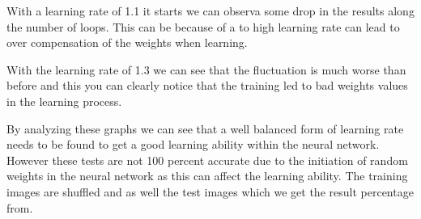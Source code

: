 \documentclass[a4paper, 12pt]{article}
\begin{document}

With a learning rate of 1.1 it starts we can observa some drop in the results along the number of loops. This can be because of a to high learning rate can lead to over compensation of the weights when learning.


With the learning rate of 1.3 we can see that the fluctuation is much worse than before and this you can clearly notice that the training led to bad weights values in the learning process.




By analyzing these graphs we can see that a well balanced form of learning rate needs to be found to get a good learning ability within the neural network. However these tests are not 100 percent accurate due to the initiation of random weights in the neural network as this can affect the learning ability. The training images are shuffled and as well the test images which we get the result percentage from.
\end{document}

